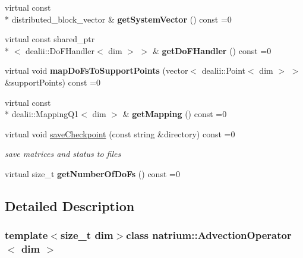 \begin{DoxyCompactItemize}
\item 
\hypertarget{classnatrium_1_1AdvectionOperator_aa1eb5cd5a2c1b6b3b8f6395bac67ef55}{virtual const \\*
distributed\-\_\-block\-\_\-vector \& {\bfseries get\-System\-Vector} () const =0}\label{classnatrium_1_1AdvectionOperator_aa1eb5cd5a2c1b6b3b8f6395bac67ef55}

\item 
\hypertarget{classnatrium_1_1AdvectionOperator_a68f51edd8cc34b61f32ded0a8db82f7b}{virtual const shared\-\_\-ptr\\*
$<$ dealii\-::\-Do\-F\-Handler$<$ dim $>$ $>$ \& {\bfseries get\-Do\-F\-Handler} () const =0}\label{classnatrium_1_1AdvectionOperator_a68f51edd8cc34b61f32ded0a8db82f7b}

\item 
\hypertarget{classnatrium_1_1AdvectionOperator_adc118010e30df45b5906d35743e5ec2e}{virtual void {\bfseries map\-Do\-Fs\-To\-Support\-Points} (vector$<$ dealii\-::\-Point$<$ dim $>$ $>$ \&support\-Points) const =0}\label{classnatrium_1_1AdvectionOperator_adc118010e30df45b5906d35743e5ec2e}

\item 
\hypertarget{classnatrium_1_1AdvectionOperator_a419e94f5534d7871cee47c027a2501c4}{virtual const \\*
dealii\-::\-Mapping\-Q1$<$ dim $>$ \& {\bfseries get\-Mapping} () const =0}\label{classnatrium_1_1AdvectionOperator_a419e94f5534d7871cee47c027a2501c4}

\item 
virtual void \hyperlink{classnatrium_1_1AdvectionOperator_aca14260bae100874b0050a2a96d7a564}{save\-Checkpoint} (const string \&directory) const =0
\begin{DoxyCompactList}\small\item\em save matrices and status to files \end{DoxyCompactList}\item 
\hypertarget{classnatrium_1_1AdvectionOperator_a251e21d1dd023926d4c5f7fd973b90bf}{virtual size\-\_\-t {\bfseries get\-Number\-Of\-Do\-Fs} () const =0}\label{classnatrium_1_1AdvectionOperator_a251e21d1dd023926d4c5f7fd973b90bf}

\end{DoxyCompactItemize}


\subsection{Detailed Description}
\subsubsection*{template$<$size\-\_\-t dim$>$class natrium\-::\-Advection\-Operator$<$ dim $>$}

